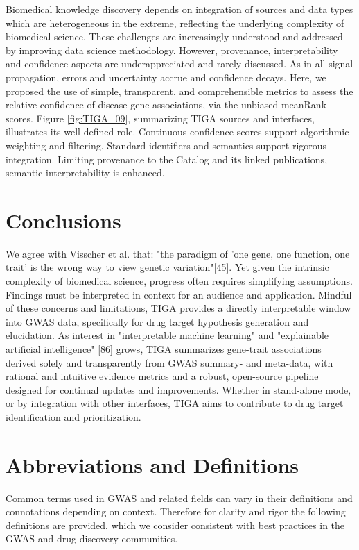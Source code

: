 Biomedical knowledge discovery depends on integration of sources and data types which are heterogeneous in the extreme, reflecting the underlying complexity of biomedical science. These challenges are increasingly understood and addressed by improving data science methodology. However, provenance, interpretability and confidence aspects are underappreciated and rarely discussed. As in all signal propagation, errors and uncertainty accrue and confidence decays. Here, we proposed the use of simple, transparent, and comprehensible metrics to assess the relative confidence of disease-gene associations, via the unbiased meanRank scores. Figure \ref{fig:TIGA_09}, summarizing TIGA sources and interfaces, illustrates its well-defined role. Continuous confidence scores support algorithmic weighting and filtering. Standard identifiers and semantics support rigorous integration. Limiting provenance to the Catalog and its linked publications, semantic interpretability is enhanced. 

\section{Conclusions}

We agree with Visscher et al. that: "the paradigm of 'one gene, one function, one trait' is the wrong way to view genetic variation"[45]. Yet given the intrinsic complexity of biomedical science, progress often requires simplifying assumptions. Findings must be interpreted in context for an audience and application. Mindful of these concerns and limitations, TIGA provides a directly interpretable window into GWAS data, specifically for drug target hypothesis generation and elucidation. As interest in "interpretable machine learning" and "explainable artificial intelligence" [86] grows, TIGA summarizes gene-trait associations derived solely and transparently from GWAS summary- and meta-data, with rational and intuitive evidence metrics and a robust, open-source pipeline designed for continual updates and improvements. Whether in stand-alone mode, or by integration with other interfaces, TIGA aims to contribute to drug target identification and prioritization. 

\section{Abbreviations and Definitions}

Common terms used in GWAS and related fields can vary in their definitions and connotations depending on context. Therefore for clarity and rigor the following definitions are provided, which we consider consistent with best practices in the GWAS and drug discovery communities.

